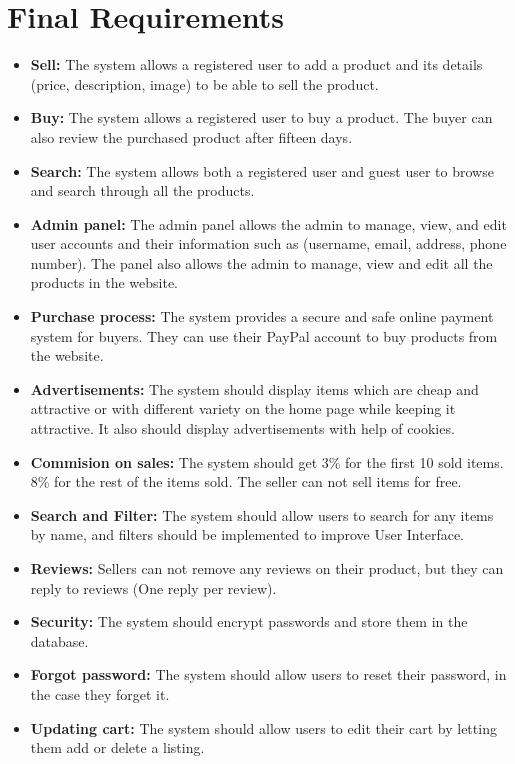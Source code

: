 \documentclass[11pt]{article}
\newcounter{use case ID}
\begin{document}
\section{Final Requirements}
\begin{itemize}
    \item \textbf{Sell:} The system allows a registered user to add a product and its details (price, description, image) to be able to sell the product.
    \item \textbf{Buy:} The system allows a registered user to buy a product. The buyer can also review the purchased product after fifteen days.
    \item \textbf{Search:} The system allows both a registered user and guest user to browse and search through all the products.
    \item \textbf{Admin panel:} The admin panel allows the admin to manage, view, and edit user accounts and their information such as (username, email, address, phone number). The panel also allows the admin to manage, view and edit all the products in the website.
    \item \textbf{Purchase process:} The system provides a secure and safe online payment system for buyers. They can use their PayPal account to buy products from the website.
    \item \textbf{Advertisements:} The system should display items which are cheap and attractive or with different variety on the home page while keeping it attractive. It also should display advertisements with help of cookies.
    \item \textbf{Commision on sales:} The system should get 3\% for the first 10 sold items. 8\% for the rest of the items sold. The seller can not sell items for free.
    \item \textbf{Search and Filter:} The system should allow users to search for any items by name, and filters should be implemented to improve User Interface.
    \item \textbf{Reviews:} Sellers can not remove any reviews on their product, but they can reply to reviews (One reply per review).
    \item \textbf{Security: } The system should encrypt passwords and store them in the database.
    \item \textbf{Forgot password:} The system should allow users to reset their password, in the case they forget it.
    \item \textbf{Updating cart:} The system should allow users to edit their cart by letting them add or delete a listing.
\end{itemize}
\end{document}
